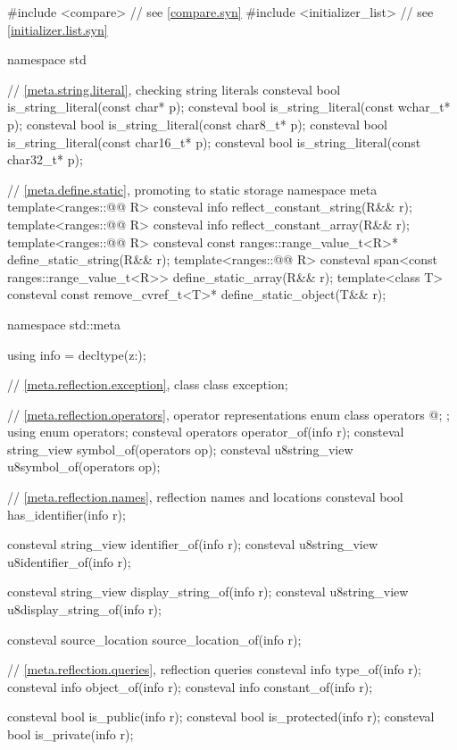 %
\begin{codeblock}
#include <compare>              // see \ref{compare.syn}
#include <initializer_list>     // see \ref{initializer.list.syn}

namespace std {
  // \ref{meta.string.literal}, checking string literals
  consteval bool is_string_literal(const char* p);
  consteval bool is_string_literal(const wchar_t* p);
  consteval bool is_string_literal(const char8_t* p);
  consteval bool is_string_literal(const char16_t* p);
  consteval bool is_string_literal(const char32_t* p);

  // \ref{meta.define.static}, promoting to static storage
  namespace meta {
    template<ranges::@@ R>
      consteval info reflect_constant_string(R&& r);
    template<ranges::@@ R>
      consteval info reflect_constant_array(R&& r);
  }
  template<ranges::@@ R>
    consteval const ranges::range_value_t<R>* define_static_string(R&& r);
  template<ranges::@@ R>
    consteval span<const ranges::range_value_t<R>> define_static_array(R&& r);
  template<class T>
    consteval const remove_cvref_t<T>* define_static_object(T&& r);
}

namespace std::meta {
  using info = decltype(^^::);

  // \ref{meta.reflection.exception}, class 
  class exception;

  // \ref{meta.reflection.operators}, operator representations
  enum class operators {
    @\seebelow@;
  };
  using enum operators;
  consteval operators operator_of(info r);
  consteval string_view symbol_of(operators op);
  consteval u8string_view u8symbol_of(operators op);

  // \ref{meta.reflection.names}, reflection names and locations
  consteval bool has_identifier(info r);

  consteval string_view identifier_of(info r);
  consteval u8string_view u8identifier_of(info r);

  consteval string_view display_string_of(info r);
  consteval u8string_view u8display_string_of(info r);

  consteval source_location source_location_of(info r);

  // \ref{meta.reflection.queries}, reflection queries
  consteval info type_of(info r);
  consteval info object_of(info r);
  consteval info constant_of(info r);

  consteval bool is_public(info r);
  consteval bool is_protected(info r);
  consteval bool is_private(info r);

}
\end{codeblock}
